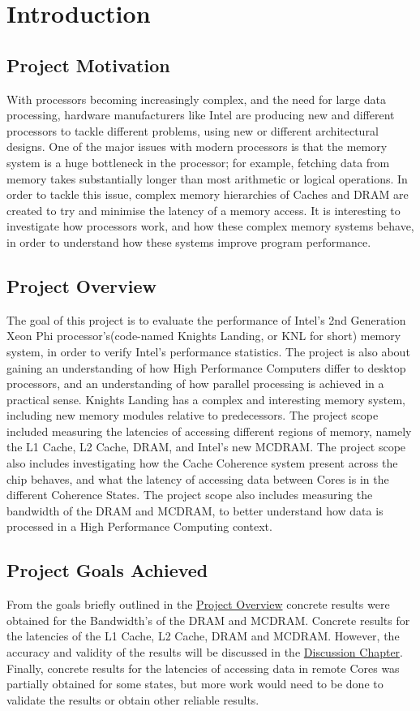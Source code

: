 \documentclass[bsc,frontabs,twoside,singlespacing,parskip,deptreport]{infthesis}     %
\begin{document}

\chapter{Introduction}
\section{Project Motivation}
With processors becoming increasingly complex, and the need for large data processing, hardware manufacturers like Intel are producing new and different processors to tackle different problems, using new or different architectural designs. One of the major issues with modern processors is that the memory system is a huge bottleneck in the processor; for example, fetching data from memory takes substantially longer than most arithmetic or logical operations. In order to tackle this issue, complex memory hierarchies of Caches and DRAM are created to try and minimise the latency of a memory access. It is interesting to investigate how processors work, and how these complex memory systems behave, in order to understand how these systems improve program performance.

\section{Project Overview}\label{proj-overview}
The goal of this project is to evaluate the performance of Intel's 2nd Generation Xeon Phi processor's(code-named Knights Landing, or KNL for short) memory system, in order to verify Intel's performance statistics. The project is also about gaining an understanding of how High Performance Computers differ to desktop processors, and an understanding of how parallel processing is achieved in a practical sense. Knights Landing has a complex and interesting memory system, including new memory modules relative to predecessors. The project scope included measuring the latencies of accessing different regions of memory, namely the L1 Cache, L2 Cache, DRAM, and Intel's new MCDRAM. The project scope also includes investigating how the Cache Coherence system present across the chip behaves, and what the latency of accessing data between Cores is in the different Coherence States. The project scope also includes measuring the bandwidth of the DRAM and MCDRAM, to better understand how data is processed in a High Performance Computing context.

\section{Project Goals Achieved}
From the goals briefly outlined in the \hyperref[proj-overview]{Project Overview} concrete results were obtained for the Bandwidth's of the DRAM and MCDRAM. Concrete results for the latencies of the L1 Cache, L2 Cache, DRAM and MCDRAM. However, the accuracy and validity of the results will be discussed in the \hyperref[chap:discussion]{Discussion Chapter}. Finally, concrete results for the latencies of accessing data in remote Cores was partially obtained for some states, but more work would need to be done to validate the results or obtain other reliable results.
\end{document}
